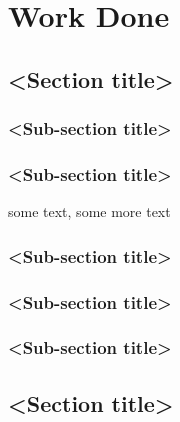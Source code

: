 \chapter{Work Done}

\section{<Section title>}

\subsection{<Sub-section title>}

\subsection{<Sub-section title>}
some text\cite{citation-2-name-here}, some more text
\subsection{<Sub-section title>}

\subsection{<Sub-section title>}

\subsection{<Sub-section title>}


\section{<Section title>}

